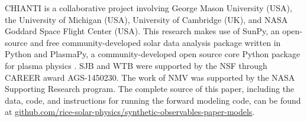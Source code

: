 \documentclass[preprint2,linenumbers,trackchanges]{aastex62}
\begin{document}






\acknowledgments
CHIANTI is a collaborative project involving George Mason University (USA), the University of Michigan (USA), University of Cambridge (UK), and NASA Goddard Space Flight Center (USA). This research makes use of SunPy, an open-source and free community-developed solar data analysis package written in Python \citep{sunpy_community_sunpypython_2015} and PlasmaPy, a community-developed open source core Python package for plasma physics \citep{plasmapy_community_2018_1238132}. SJB and WTB were supported by the NSF through CAREER award AGS-1450230. The work of NMV was supported by the NASA Supporting Research program. The complete source of this paper, including the data, code, and instructions for running the forward modeling code, can be found at \href{https://github.com/rice-solar-physics/synthetic-observables-paper-models}{github.com/rice-solar-physics/synthetic-observables-paper-models}.


\end{document}
